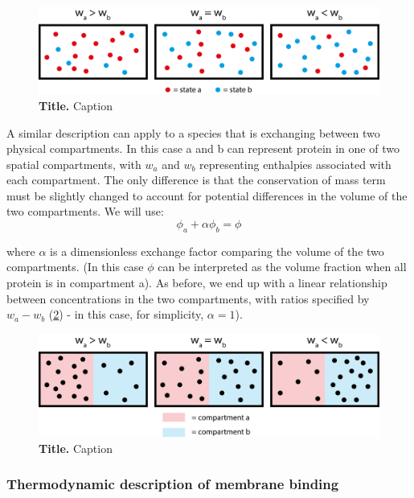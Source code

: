 \documentclass[12pt]{"article"}
\newcommand{\mycaption}[2]{\caption[#1]{\textbf{#1.} #2}}
\begin{document}
\begin{figure}[!h]
\includegraphics[scale=0.9]{thermodynamic_simple_example2}
\setlength{\abovecaptionskip}{20pt}
\centering
\mycaption{Title}{Caption}
\label{fig:thermodynamic_simple_example2}
\end{figure}

A similar description can apply to a species that is exchanging between two physical compartments. In this case a and b can represent protein in one of two spatial compartments, with $w_a$ and $w_b$ representing enthalpies associated with each compartment. The only difference is that the conservation of mass term must be slightly changed to account for potential differences in the volume of the two compartments. We will use:
\begin{equation}
\phi_a + \alpha\phi_b = \phi
\end{equation}

where $\alpha$ is a dimensionless exchange factor comparing the volume of the two compartments. (In this case $\phi$ can be interpreted as the volume fraction when all protein is in compartment a). As before, we end up with a linear relationship between concentrations in the two compartments, with ratios specified by $w_a - w_b$ (\cref{fig:thermodynamic_simple_example}) - in this case, for simplicity, $\alpha = 1$).

\begin{figure}[!h]
\includegraphics[scale=0.9]{thermodynamic_simple_example}
\setlength{\abovecaptionskip}{20pt}
\centering
\mycaption{Title}{Caption}
\label{fig:thermodynamic_simple_example}
\end{figure}

\subsubsection{Thermodynamic description of membrane binding}
\end{document}
